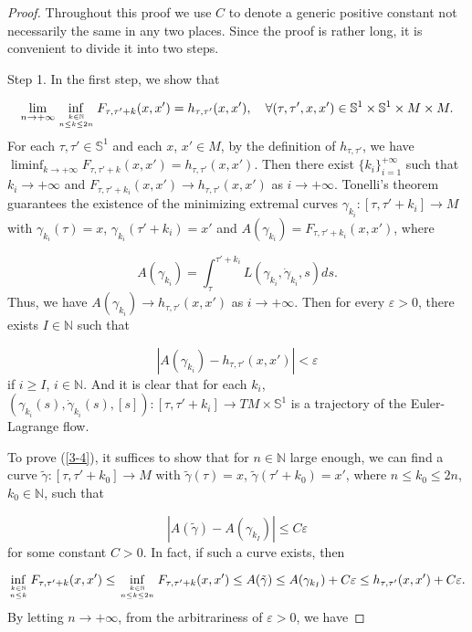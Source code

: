 \documentclass{amsart}[12pt]
\theoremstyle{definition}
\theoremstyle{remark}
\numberwithin{equation}{section}
\begin{document}
\begin{proof}
Throughout this proof we use $C$ to denote a generic positive
constant not necessarily the same in any two places. Since the
proof is rather long, it is convenient to divide it into two
steps.

Step 1. In the first step, we show that

\begin{align}\label{3-4}
\lim_{n\to+\infty}\inf_{k\in\mathbb{N} \atop n\leq k\leq
2n}F_{\tau,\tau'+k}(x,x')=h_{\tau,\tau'}(x,x'), \quad \forall
(\tau,\tau',x,x')\in \mathbb{S}^1\times\mathbb{S}^1\times M\times
M.
\end{align}
For each $\tau,\tau'\in\mathbb{S}^1$ and each $x$, $x'\in M$, by
the definition of $h_{\tau,\tau'}$, we have
$\liminf_{k\to+\infty}F_{\tau,\tau'+k}(x,x')=h_{\tau,\tau'}(x,x')$.
Then there exist $\{k_i\}_{i=1}^{+\infty}$ such that
$k_i\to+\infty$ and $F_{\tau,\tau'+k_i}(x,x')\to
h_{\tau,\tau'}(x,x')$ as $i\to+\infty$. Tonelli's theorem
guarantees the existence of the minimizing extremal curves
$\gamma_{k_i}:[\tau,\tau'+k_i]\to M$ with $\gamma_{k_i}(\tau)=x$,
$\gamma_{k_i}(\tau'+k_i)=x'$ and
$A(\gamma_{k_i})=F_{\tau,\tau'+k_i}(x,x')$, where

\[
A(\gamma_{k_i})=\int_{\tau}^{\tau'+k_i}
L(\gamma_{k_i},\dot{\gamma}_{k_i},s)ds.
\]
Thus, we have $A(\gamma_{k_i})\to h_{\tau,\tau'}(x,x')$ as
$i\to+\infty$. Then for every $\varepsilon>0$, there exists
$I\in\mathbb{N}$ such that

\[
|A(\gamma_{k_i})-h_{\tau,\tau'}(x,x')|<\varepsilon
\]
if $i\geq I$, $i\in \mathbb{N}$. And it is clear that for each
$k_i$,
$(\gamma_{k_i}(s),\dot{\gamma}_{k_i}(s),[s]):[\tau,\tau'+k_i]\to
TM\times\mathbb{S}^1$ is a trajectory of the Euler-Lagrange flow.

To prove (\ref{3-4}), it suffices to show that for
$n\in\mathbb{N}$ large enough, we can find a curve
$\tilde{\gamma}:[\tau,\tau'+k_0]\to M$ with
$\tilde{\gamma}(\tau)=x$, $\tilde{\gamma}(\tau'+k_0)=x'$, where
$n\leq k_0\leq2n$, $k_0\in\mathbb{N}$, such that

\[
|A(\tilde{\gamma})-A(\gamma_{k_I})|\leq C\varepsilon
\]
for some constant $C>0$. In fact, if such a curve exists, then

\[
\inf_{k\in\mathbb{N} \atop n\leq
k}F_{\tau,\tau'+k}(x,x')\leq\inf_{k\in\mathbb{N} \atop n\leq k\leq
2n}F_{\tau,\tau'+k}(x,x')\leq A(\tilde{\gamma})\leq
A(\gamma_{k_I})+C\varepsilon\leq
h_{\tau,\tau'}(x,x')+C\varepsilon.
\]
By letting $n\to+\infty$, from the arbitrariness of
$\varepsilon>0$, we have


\end{proof}
\end{document}
